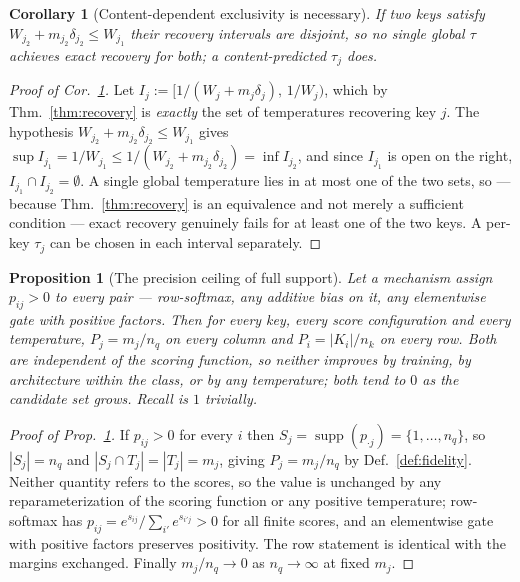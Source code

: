 \documentclass{article}
\newtheorem{proposition}{Proposition}
\newtheorem{corollary}{Corollary}
\newcommand{\supp}{\operatorname{supp}}
\begin{document}
\begin{corollary}[Content-dependent exclusivity is necessary]
\label{cor:necessity}
If two keys satisfy $W_{j_2}+m_{j_2}\delta_{j_2}\le W_{j_1}$ their recovery intervals are
disjoint, so no single global $\tau$ achieves exact recovery for both; a content-predicted
$\tau_j$ does.
\end{corollary}

\begin{proof}[Proof of Cor.~\ref{cor:necessity}]
Let $I_{j} := \big[1/(W_j+m_j\delta_j),\, 1/W_j\big)$, which by Thm.~\ref{thm:recovery} is
\emph{exactly} the set of temperatures recovering key $j$. The hypothesis
$W_{j_2}+m_{j_2}\delta_{j_2} \leq W_{j_1}$ gives
$\sup I_{j_1}=1/W_{j_1} \leq 1/(W_{j_2}+m_{j_2}\delta_{j_2})=\inf I_{j_2}$, and since $I_{j_1}$
is open on the right, $I_{j_1} \cap I_{j_2} = \emptyset$. A single global temperature lies in at
most one of the two sets, so --- because Thm.~\ref{thm:recovery} is an equivalence and not
merely a sufficient condition --- exact recovery genuinely fails for at least one of the two
keys. A per-key $\tau_j$ can be chosen in each interval separately.
\end{proof}

\begin{proposition}[The precision ceiling of full support]
\label{prop:fullsupportceiling}
Let a mechanism assign $p_{ij}>0$ to every pair --- row-softmax, any additive bias on it, any
elementwise gate with positive factors. Then for every key, every score configuration and every
temperature, $P_j = m_j/n_q$ on every column and $P_i = |K_i|/n_k$ on every row. Both are
independent of the scoring function, so neither improves by training, by architecture within the
class, or by any temperature; both tend to $0$ as the candidate set grows. Recall is $1$
trivially.
\end{proposition}

\begin{proof}[Proof of Prop.~\ref{prop:fullsupportceiling}]
If $p_{ij} > 0$ for every $i$ then $S_j = \supp(p_{\cdot j}) = \{1,\dots,n_q\}$, so
$|S_j| = n_q$ and $|S_j \cap T_j| = |T_j| = m_j$, giving $P_j = m_j/n_q$ by
Def.~\ref{def:fidelity}. Neither quantity refers to the scores, so the value is unchanged by any
reparameterization of the scoring function or any positive temperature; row-softmax has
$p_{ij} = e^{s_{ij}}/\sum_{i'}e^{s_{i'j}} > 0$ for all finite scores, and an elementwise gate
with positive factors preserves positivity. The row statement is identical with the margins
exchanged. Finally $m_j/n_q \to 0$ as $n_q \to \infty$ at fixed $m_j$.
\end{proof}
\end{document}
